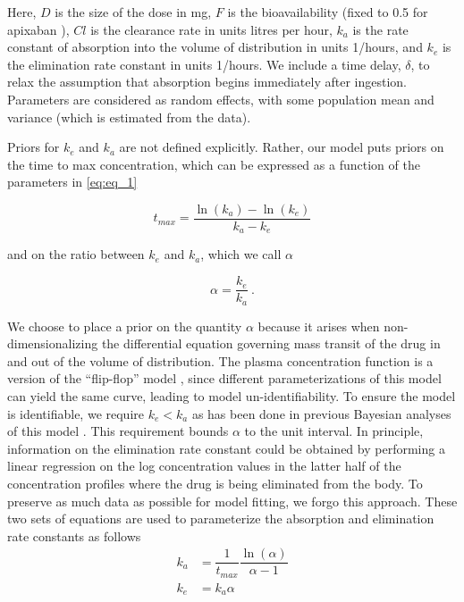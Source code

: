 \noindent Here, $D$ is the size of the dose in mg, $F$ is the bioavailability (fixed to 0.5 for apixaban \cite{Byon2019-gf}), $\mathit{Cl}$ is the clearance rate in units litres per hour, $k_a$ is the rate constant of absorption into the volume of distribution in units 1/hours, and $k_e$ is the elimination rate constant in units 1/hours. We include a time delay, $\delta$, to relax the assumption that absorption begins immediately after ingestion.  Parameters are considered as random effects, with some population mean and variance (which is estimated from the data). 

Priors for $k_e$ and $k_a$ are not defined explicitly.  Rather, our model puts priors on the time to max concentration, which can be expressed as a function of the parameters in \cref{eq:eq_1}

\begin{equation}\label{eq:eq_2}
 t_{\mathit{max}} = \dfrac{\ln(k_a) - \ln(k_e)}{k_a - k_e}
\end{equation}

\noindent and on the ratio between $k_e$ and $k_a$, which we call $\alpha$

\begin{equation}\label{eq:eq_3}
\alpha  = \dfrac{k_e}{k_a} \>.
\end{equation}

\noindent We choose to place a prior on the quantity $\alpha$ because it arises when non-dimensionalizing \citep{Lin1988-pr} the differential equation governing mass transit of the drug in and out of the volume of distribution.  The plasma concentration function is a version of the “flip-flop” model \citep{Wakefield1996-yy, Salway2008-gi}, since different parameterizations of this model can yield the same curve, leading to model un-identifiability. To ensure the model is identifiable, we require $k_e<k_a$ as has been done in previous Bayesian analyses of this model \citep{Wakefield1996-yy, Salway2008-gi}. This requirement bounds $\alpha$ to the unit interval.  In principle, information on the elimination rate constant could be obtained by performing a linear regression on the log concentration values in the latter half of the concentration profiles where the drug is being eliminated from the body. To preserve as much data as possible for model fitting, we forgo this approach.  These two sets of equations are used to parameterize the absorption and elimination rate constants as follows
\begin{align}
	k_a &= \dfrac{1}{t_{\mathit{max}}} \dfrac{\ln(\alpha)}{\alpha-1} \label{eq:eq_4} \\
	k_e &= k_a \alpha \label{eq:eq_5}
\end{align}

